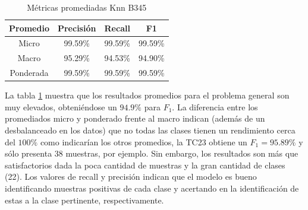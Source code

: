 \begin{table}[H]	
	\centering
	\captionsetup{justification=centering}
	\begin{tabular}{|c|c|c|c|}
		\hline
		Promedio & Precisión & Recall & F1 \\ \hline
		Micro & 99.59\% & 99.59\% & 99.59\% \\ \hline
		Macro & 95.29\% & 94.53\% & 94.90\% \\ \hline
		Ponderada & 99.59\% & 99.59\% & 99.59\% \\ \hline
	\end{tabular}
	\caption{Métricas promediadas Knn B345}
	\label{res:knn_report_resumen_b345}
\end{table}

La tabla \ref{res:knn_report_resumen_b345} muestra que los resultados promedios para el problema general son muy elevados, obteniéndose un $94.9\%$ para $F_{1}$. La diferencia entre los promediados micro y ponderado frente al macro indican (además de un desbalanceado en los datos) que no todas las clases tienen un rendimiento cerca del $100\%$ como indicarían los otros promedios, la TC23 obtiene un $F_{1} = 95.89\%$ y sólo presenta 38 muestras, por ejemplo. Sin embargo, los resultados son más que satisfactorios dada la poca cantidad de muestras y la gran cantidad de clases (22). Los valores de recall y precisión indican que el modelo es bueno identificando muestras positivas de cada clase y acertando en la identificación de estas a la clase pertinente, respectivamente.

	
